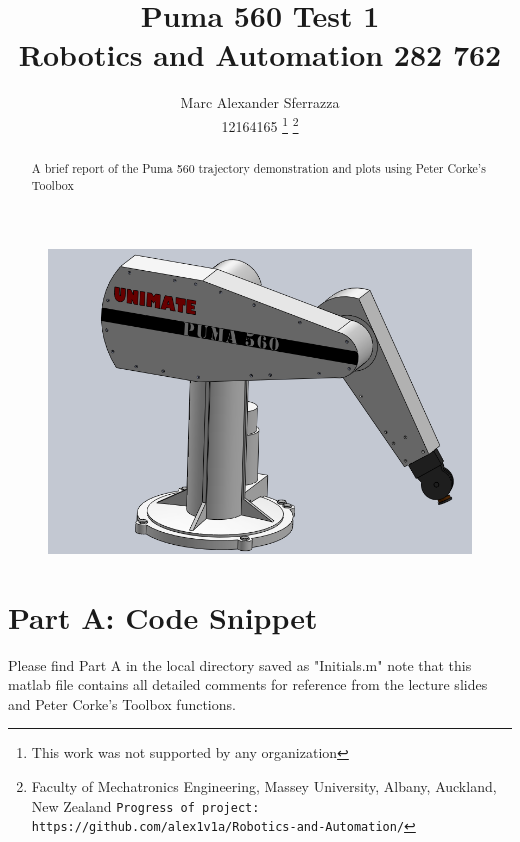 \documentclass[a4paper, 10pt]{article}
\title{\LARGE \bf Puma 560 Test 1\\Robotics and Automation  282 762}
\author{Marc Alexander Sferrazza \\ 12164165
\thanks{This work was not supported by any organization}
\thanks{Faculty of Mechatronics Engineering, Massey University, Albany, Auckland, New Zealand
        {\tt\small Progress of project: https://github.com/alex1v1a/Robotics-and-Automation/} } }
\begin{document}
\maketitle

\begin{figure}[H]
  \includegraphics[width=\linewidth]{images/puma}
  \label{fig:opencv}
\end{figure}

\thispagestyle{empty}
\pagestyle{plain}



\begin{abstract}

A brief report of the Puma 560 trajectory demonstration and plots using Peter Corke's Toolbox

\end{abstract}


\clearpage
\tableofcontents
\listoffigures
\thispagestyle{empty}
\clearpage


\setcounter{page}{1}

\section{Part A: Code Snippet}
Please find Part A in the local directory saved as "Initials.m" note that this matlab file contains all detailed comments for reference from the lecture slides and Peter Corke's Toolbox functions. 
\end{document}
